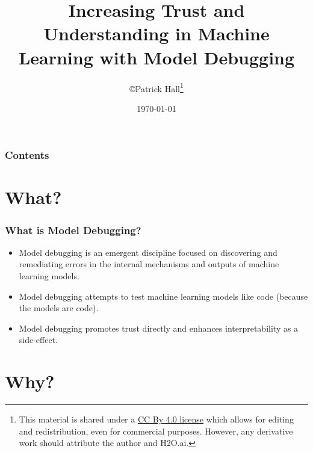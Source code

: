 \documentclass[11pt,
               aspectratio=43,
               hyperref={colorlinks}
               ]{beamer}
\author{\copyright\hspace{1pt}Patrick Hall\footnote{\tiny{This material is shared under a \href{https://creativecommons.org/licenses/by/4.0/deed.ast}{CC By 4.0 license} which allows for editing and redistribution, even for commercial purposes. However, any derivative work should attribute the author and H2O.ai.}}}
\title{Increasing Trust and Understanding in Machine Learning with Model Debugging }
\institute{\href{https://www.h2o.ai}{H\textsubscript{2}O.ai}}
\date{\today}
\begin{document}
	
	\maketitle
	
	\begin{frame}
	
		\frametitle{Contents}
		
		\tableofcontents{}
		
	\end{frame}

	\section{What?}

	\begin{frame}
		
		\frametitle{What is Model Debugging?}
		
		\begin{itemize}
			\item Model debugging is an emergent discipline focused on discovering and remediating errors in the internal mechanisms and outputs of machine learning models. 
			\item Model debugging attempts to test machine learning models like code (because the models are code).
			\item Model debugging promotes trust directly and enhances interpretability as a side-effect.
		\end{itemize}	
		
	\end{frame}

	\section{Why?}
\end{document}
